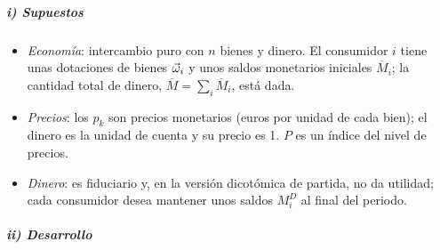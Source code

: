 \documentclass[11pt]{article}
\begin{document}
\subparagraph{i) Supuestos}

\begin{itemize}
\item \emph{Economía}: intercambio puro con $n$ bienes y dinero. El consumidor $i$ tiene unas dotaciones de bienes $\vec{\omega}_i$ y unos saldos monetarios iniciales $\overline{M}_i$; la cantidad total de dinero, $\overline{M}=\sum_i\overline{M}_i$, está dada.
\item \emph{Precios}: los $p_k$ son precios monetarios (euros por unidad de cada bien); el dinero es la unidad de cuenta y su precio es 1. $P$ es un índice del nivel de precios.
\item \emph{Dinero}: es fiduciario y, en la versión dicotómica de partida, no da utilidad; cada consumidor desea mantener unos saldos $M^D_i$ al final del periodo.
\end{itemize}

\subparagraph{ii) Desarrollo}
\end{document}
